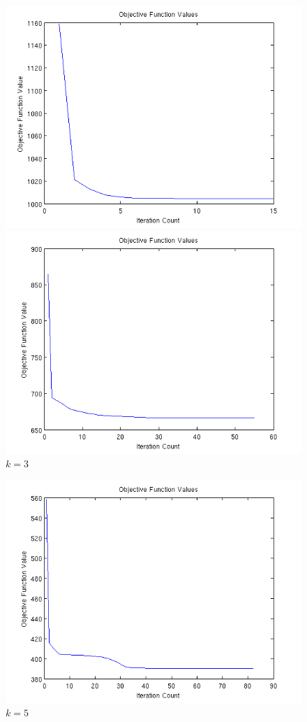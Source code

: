 \begin{figure}[h]
  \begin{minipage}[b]{0.5\linewidth}
    \centering
    \includegraphics[width=1\linewidth]{../img/data8b2e5c2.png}
    \caption{$k = 2$}
  \end{minipage}
  \begin{minipage}[b]{0.5\linewidth}
    \centering
    \includegraphics[width=1\linewidth]{../img/data8b2e5c3.png}
    \caption{$k = 3$}	
  \end{minipage}
\end{figure}
\begin{figure}[h]
    \centering
    \includegraphics[width=0.5\linewidth]{../img/data8b2e5c5.png}
    \caption{$k = 5$}
\end{figure}

